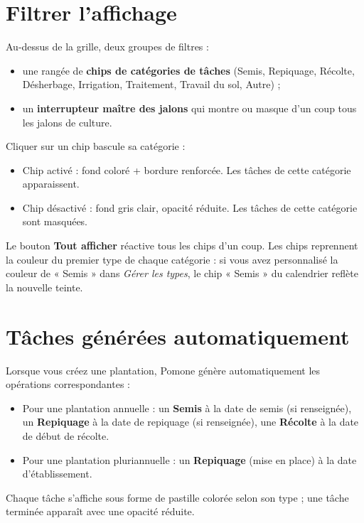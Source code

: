 \section{Filtrer l'affichage}

Au-dessus de la grille, deux groupes de filtres :

\begin{itemize}
  \item une rangée de \textbf{chips de catégories de tâches} (Semis, Repiquage, Récolte, Désherbage, Irrigation, Traitement, Travail du sol, Autre) ;
  \item un \textbf{interrupteur maître des jalons} qui montre ou masque d'un coup tous les jalons de culture.
\end{itemize}

Cliquer sur un chip bascule sa catégorie :

\begin{itemize}
  \item Chip activé : fond coloré + bordure renforcée. Les tâches de cette catégorie apparaissent.
  \item Chip désactivé : fond gris clair, opacité réduite. Les tâches de cette catégorie sont masquées.
\end{itemize}

Le bouton \textbf{Tout afficher} réactive tous les chips d'un coup. Les chips reprennent la couleur du premier type de chaque catégorie : si vous avez personnalisé la couleur de « Semis » dans \emph{Gérer les types}, le chip « Semis » du calendrier reflète la nouvelle teinte.

\section{Tâches générées automatiquement}

Lorsque vous créez une plantation, Pomone génère automatiquement les opérations correspondantes :

\begin{itemize}
  \item Pour une plantation annuelle : un \textbf{Semis} à la date de semis (si renseignée), un \textbf{Repiquage} à la date de repiquage (si renseignée), une \textbf{Récolte} à la date de début de récolte.
  \item Pour une plantation pluriannuelle : un \textbf{Repiquage} (mise en place) à la date d'établissement.
\end{itemize}

Chaque tâche s'affiche sous forme de pastille colorée selon son type ; une tâche terminée apparaît avec une opacité réduite.

